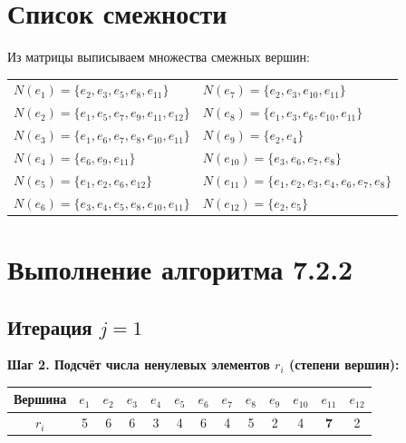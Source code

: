 \documentclass[a4paper,12pt]{article}
\begin{document}
\section*{Список смежности}

Из матрицы выписываем множества смежных вершин:

\begin{center}
	\begin{tabular}{ll}
		$N(e_1) = \{e_2, e_3, e_5, e_8, e_{11}\}$         &
		$N(e_7) = \{e_2, e_3, e_{10}, e_{11}\}$             \\
		$N(e_2) = \{e_1, e_5, e_7, e_9, e_{11}, e_{12}\}$ &
		$N(e_8) = \{e_1, e_3, e_6, e_{10}, e_{11}\}$        \\
		$N(e_3) = \{e_1, e_6, e_7, e_8, e_{10}, e_{11}\}$ &
		$N(e_9) = \{e_2, e_4\}$                             \\
		$N(e_4) = \{e_6, e_9, e_{11}\}$                   &
		$N(e_{10}) = \{e_3, e_6, e_7, e_8\}$                \\
		$N(e_5) = \{e_1, e_2, e_6, e_{12}\}$              &
		$N(e_{11}) = \{e_1, e_2, e_3, e_4, e_6, e_7, e_8\}$ \\
		$N(e_6) = \{e_3, e_4, e_5, e_8, e_{10}, e_{11}\}$ &
		$N(e_{12}) = \{e_2, e_5\}$                          \\
	\end{tabular}
\end{center}

\section*{Выполнение алгоритма 7.2.2}

\subsection*{Итерация $j = 1$}

\textbf{Шаг 2. Подсчёт числа ненулевых элементов $r_i$ (степени вершин):}

\begin{center}
	\begin{tabular}{|c|*{12}{c|}}
		\hline
		Вершина & $e_1$ & $e_2$ & $e_3$ & $e_4$ & $e_5$ & $e_6$ & $e_7$ & $e_8$ & $e_9$ & $e_{10}$ & $e_{11}$   & $e_{12}$ \\
		\hline
		$r_i$   & 5     & 6     & 6     & 3     & 4     & 6     & 4     & 5     & 2     & 4        & \textbf{7} & 2        \\
		\hline
	\end{tabular}
\end{center}
\end{document}
